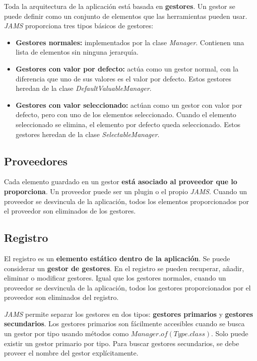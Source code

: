 Toda la arquitectura de la aplicación está basada en \textbf{gestores}.
Un gestor se puede definir como un conjunto de elementos que las herramientas pueden usar.
\textit{JAMS} proporciona tres tipos básicos de gestores:
\begin{itemize}
    \item \textbf{Gestores normales:} implementados por la clase \textit{Manager}.
    Contienen una lista de elementos sin ninguna jerarquía.
    \item \textbf{Gestores con valor por defecto:} actúa como un gestor normal, con la
    diferencia que uno de sus valores es el valor por defecto.
    Estos gestores heredan de la clase \textit{DefaultValuableManager}.
    \item \textbf{Gestores con valor seleccionado:} actúan como un gestor con valor por defecto,
    pero con uno de los elementos seleccionado.
    Cuando el elemento seleccionado se elimina, el elemento por defecto queda seleccionado.
    Estos gestores heredan de la clase \textit{SelectableManager}.
\end{itemize}

\subsection{Proveedores}\label{subsec:proveedores}

Cada elemento guardado en un gestor \textbf{está asociado al proveedor que lo proporciona}.
Un proveedor puede ser un plugin o el propio \textit{JAMS}.
Cuando un proveedor se desvincula de la aplicación, todos los elementos proporcionados
por el proveedor son eliminados de los gestores.

\subsection{Registro}\label{subsec:registro}

El registro es un \textbf{elemento estático dentro de la aplicación}.
Se puede considerar un \textbf{gestor de gestores}.
En el registro se pueden recuperar, añadir, eliminar o modificar gestores.
Igual que los gestores normales, cuando un proveedor se desvincula de la aplicación,
todos los gestores proporcionados por el proveedor son eliminados del registro.

\noindent \textit{JAMS} permite separar los gestores en dos tipos:
\textbf{gestores primarios} y \textbf{gestores secundarios}.
Los gestores primarios son fácilmente accesibles cuando se busca un gestor por tipo
usando métodos como $Manager.of(Type.class)$.
Solo puede existir un gestor primario por tipo.
Para buscar gestores secundarios, se debe proveer el nombre del gestor explícitamente.

